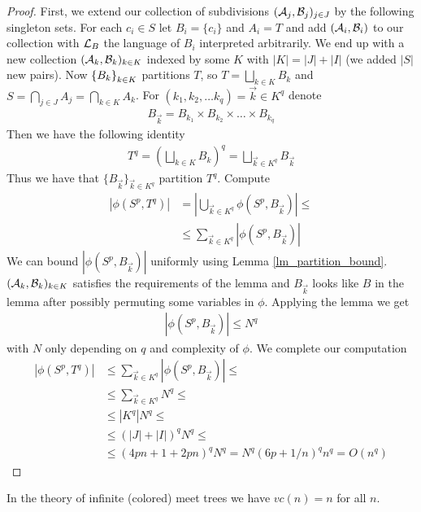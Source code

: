 \begin{proof}
  First, we extend our collection of subdivisions $(\mathcal A_j, \mathcal B_j)_{j \in J}$ by the following singleton sets. For each $c_i \in S$ let $B_i = \{c_i\}$ and $A_i = T$ and add $(\mathcal A_i, \mathcal B_i)$ to our collection with $\mathcal L_B$ the language of $B_i$ interpreted arbitrarily. We end up with a new collection $(\mathcal A_k, \mathcal B_k)_{k \in K}$ indexed by some $K$ with $|K| = |J| + |I|$ (we added $|S|$ new pairs). Now $\left\{B_k\right\}_{k \in K}$ partitions $T$, so $T = \bigsqcup_{k \in K} B_k$ and $S = \bigcap_{j \in J} A_j = \bigcap_{k \in K} A_k$. For $(k_1, k_2, \ldots k_q) = \vec k \in K^q$ denote 
  \begin{align*}
    B_{\vec k} = B_{k_1} \times B_{k_2} \times \ldots \times B_{k_q}
  \end{align*}
  Then we have the following identity
  \begin{align*}
    T^q = (\bigsqcup_{k \in K} B_k)^q = \bigsqcup_{\vec k \in K^q} B_{\vec k}
  \end{align*}
  Thus we have that $\{B_{\vec k}\}_{\vec k \in K^q}$ partition $T^q$. Compute
  \begin{align*}
    |\phi(S^p, T^q)|
    &= \left|\bigcup_{\vec k \in K^q} \phi(S^p, B_{\vec k}) \right| \leq \\
    &\leq \sum_{\vec k \in K^q} |\phi(S^p, B_{\vec k})|
  \end{align*}
  We can bound $|\phi(S^p, B_{\vec k})|$ uniformly using Lemma \ref{lm_partition_bound}. $(\mathcal A_k, \mathcal B_k)_{k \in K}$ satisfies the requirements of the lemma and $B_{\vec k}$ looks like $B$ in the lemma after possibly permuting some variables in $\phi$. Applying the lemma we get
  \begin{align*}
    |\phi(S^p, B_{\vec k})| \leq N^q
  \end{align*}
  with $N$ only depending on $q$ and complexity of $\phi$. We complete our computation
  \begin{align*}
    |\phi(S^p, T^q)|
    &\leq \sum_{\vec k \in K^q} |\phi(S^p, B_{\vec k})| \leq \\
    &\leq \sum_{\vec k \in K^q} N^q \leq \\
    &\leq |K^q| N^q \leq \\
    &\leq (|J| + |I|)^q N^q \leq \\
    &\leq (4pn + 1 + 2pn)^q N^q = N^q (6p + 1/n)^q n^q = O(n^q)
  \end{align*}
\end{proof}
\begin{Corollary}
  In the theory of infinite (colored) meet trees we have $vc(n) = n$ for all $n$.
\end{Corollary}
